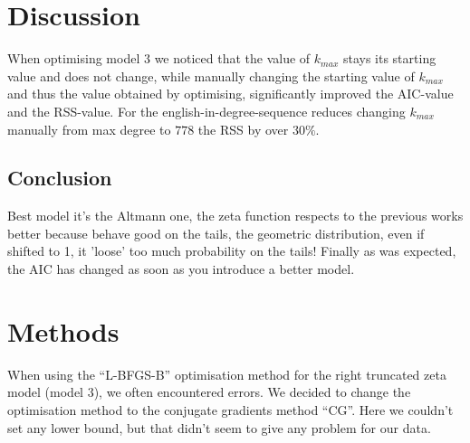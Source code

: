 \documentclass[paper=a4, fontsize=11pt]{scrartcl} %
\theoremstyle{plain}
\begin{document}
\newpage

\section{Discussion}
When optimising model $3$ we noticed that the value of $k_{max}$ stays its starting value and does not change, while manually changing the starting value of $k_{max}$ and thus the value obtained by optimising, significantly improved the AIC-value and the RSS-value. For the english-in-degree-sequence reduces changing $k_{max}$ manually from max degree to $778$ the RSS by over $30\%$.

\subsection{Conclusion}
Best model it's the Altmann one, the zeta function respects to the previous works better because behave good on the tails, the geometric distribution, even if shifted to 1, it 'loose' too much probability on the tails!
Finally as was expected, the AIC has changed as soon as you introduce a better model.
\section{Methods}
When using the ``L-BFGS-B'' optimisation method for the right truncated zeta model (model $3$), we often encountered errors. We decided to change the optimisation method to the conjugate gradients method ``CG''. Here we couldn't set any lower bound, but that didn't seem to give any problem for our data.\\
\end{document}

